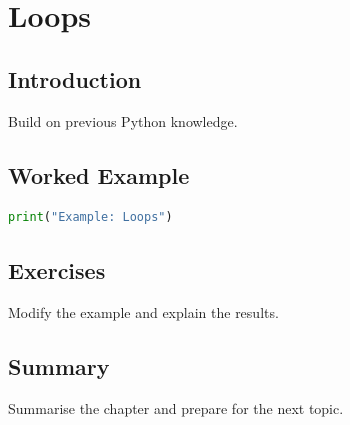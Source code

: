 \chapter{Loops}
\label{chap:vol3-7}


\section{Introduction}
Build on previous Python knowledge.

\section{Worked Example}
\begin{lstlisting}[language=Python]
print("Example: Loops")
\end{lstlisting}

\section{Exercises}
\begin{exercise}
Modify the example and explain the results.
\end{exercise}

\section{Summary}
Summarise the chapter and prepare for the next topic.
